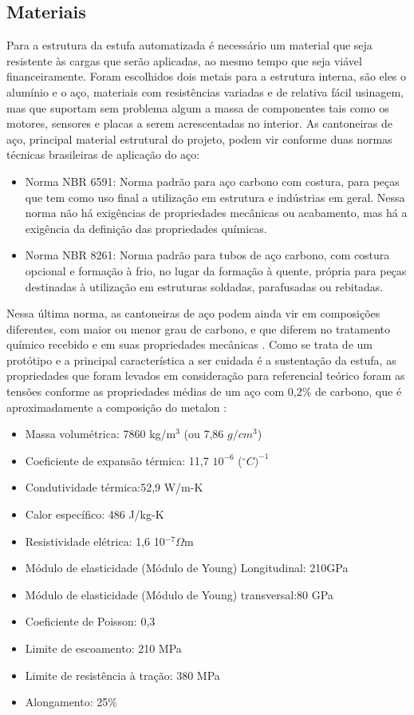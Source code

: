\subsection{Materiais}
Para a estrutura da estufa automatizada é necessário um material que seja resistente às cargas que serão aplicadas, ao mesmo tempo que seja viável financeiramente. Foram escolhidos dois metais para a estrutura interna, são eles o alumínio e o aço, materiais com resistências variadas e de relativa fácil usinagem, mas que suportam sem problema algum a massa de componentes tais como os motores, sensores e placas a serem acrescentadas no interior. As cantoneiras de aço, principal material estrutural do projeto, podem vir conforme duas normas técnicas brasileiras de aplicação do aço:
\begin{itemize}
	\item Norma NBR 6591: Norma padrão para aço carbono com costura, para peças que tem como uso final a utilização em estrutura e indústrias em geral. Nessa norma não há exigências de propriedades mecânicas ou acabamento, mas há a exigência da definição das propriedades químicas.
	
	\item Norma NBR 8261: Norma padrão para tubos de aço carbono, com costura opcional e formação à frio, no lugar da formação à quente, própria para peças destinadas à utilização em estruturas soldadas, parafusadas ou rebitadas.
\end{itemize}
Nessa última norma, as cantoneiras de aço podem ainda vir em composições diferentes, com maior ou menor grau de carbono, e que diferem no tratamento químico recebido e em suas propriedades mecânicas \cite{tubonasa}.
Como se trata de um protótipo e a principal característica a ser cuidada é a sustentação da estufa, as propriedades que foram levados em consideração para referencial teórico foram as tensões conforme as propriedades médias de um aço com 0,2\% de carbono, que é aproximadamente a composição do metalon \cite{callister2002wd}:
\begin{itemize}
	\item Massa volumétrica: 7860 kg/m$^{3}$ (ou 7,86 $g/cm^{3}$)
	\item Coeficiente de expansão térmica: 11,7 $10^{-6}$ ($^{\circ}C)^{-1}$
	\item Condutividade térmica:52,9 W/m-K
	\item Calor específico: 486 J/kg-K
	\item Resistividade elétrica: 1,6 10$^{-7}\Omega$m
	\item Módulo de elasticidade (Módulo de Young) Longitudinal: 210GPa
	\item Módulo de elasticidade (Módulo de Young) transversal:80 GPa
	\item Coeficiente de Poisson: 0,3
	\item Limite de escoamento: 210 MPa
	\item Limite de resistência à tração: 380 MPa
	\item Alongamento: 25\%
\end{itemize}

